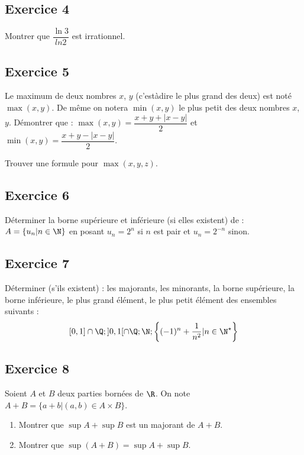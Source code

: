 \documentclass[letterpaper,10pt,french]{jupyterBook}
\begin{document}
\subsection{Exercice 4}
\label{\detokenize{exo1:exercice-4}}
\sphinxAtStartPar
Montrer que \(\dfrac{\ln 3}{ln 2}\) est irrationnel.


\subsection{Exercice 5}
\label{\detokenize{exo1:exercice-5}}
\sphinxAtStartPar
Le maximum de deux nombres \(x\), \(y\) (c’est\sphinxhyphen{}à\sphinxhyphen{}dire le plus grand des deux) est noté \(\max(x, y)\). De même on notera
\(\min(x, y)\) le plus petit des deux nombres \(x\), \(y\). Démontrer que :
\(\max(x, y) = \dfrac{x+y+|x−y|}{2}\) et \(\min(x, y) = \dfrac{x+y−|x−y|}{2}\).

\sphinxAtStartPar
Trouver une formule pour \(\max(x, y,z)\).


\subsection{Exercice 6}
\label{\detokenize{exo1:exercice-6}}
\sphinxAtStartPar
Déterminer la borne supérieure et inférieure (si elles existent) de : \(A = \{u_n | n \in \N\}\) en posant \(u_n = 2^n\)
si \(n\) est pair et \(u_n = 2^{−n}\) sinon.


\subsection{Exercice 7}
\label{\detokenize{exo1:exercice-7}}
\sphinxAtStartPar
Déterminer (s’ils existent) : les majorants, les minorants, la borne supérieure, la borne inférieure, le plus grand
élément, le plus petit élément des ensembles suivants :
\begin{equation*}
\begin{split}
[0, 1]\cap \Q; ]0, 1[\cap \Q; \N; \left\{(-1)^n + \dfrac{1}{n^2} | n \in \N^\star \right\}
\end{split}
\end{equation*}

\subsection{Exercice 8}
\label{\detokenize{exo1:exercice-8}}
\sphinxAtStartPar
Soient \(A\) et \(B\) deux parties bornées de \(\R\). On note \(A+B = \{a+b | (a,b) \in  A\times B\}\).
\begin{enumerate}
%
\item {} 
\sphinxAtStartPar
Montrer que \(\sup A+\sup B\) est un majorant de \(A+B\).

\item {} 
\sphinxAtStartPar
Montrer que \(\sup(A+B) = \sup A+\sup B\).

\end{enumerate}
\end{document}
